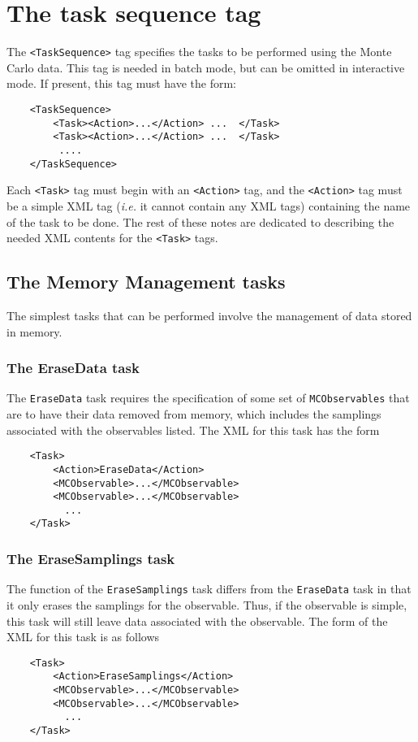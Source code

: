 \documentclass[12pt]{article}
\newcommand{\vb}{\texttt}
\begin{document}
\section{The task sequence tag}

The \vb{<TaskSequence>} tag specifies the tasks to be performed using the 
Monte Carlo data.  This tag is needed in batch mode, but 
can be omitted in interactive mode.  If present, this tag must have the form:
\begin{verbatim}
    <TaskSequence>
        <Task><Action>...</Action> ...  </Task>
        <Task><Action>...</Action> ...  </Task>
         .... 
    </TaskSequence>
\end{verbatim}
Each \vb{<Task>} tag must begin with an \vb{<Action>} tag, and
the \vb{<Action>} tag must be a simple XML tag (\textit{i.e.} it cannot contain
any XML tags) containing the name of the task to be done.
The rest of these notes are dedicated to describing the needed XML contents
for the \vb{<Task>} tags.

\subsection{The Memory Management tasks}

The simplest tasks that can be performed involve the management
of data stored in memory.

\subsubsection{The EraseData task}

The \vb{EraseData} task requires the specification of some set
of \vb{MCObservables} that are to have their data removed
from memory, which includes the samplings associated with
the observables listed. The XML for this task has the form
\begin{verbatim}
    <Task>
        <Action>EraseData</Action>
        <MCObservable>...</MCObservable> 
        <MCObservable>...</MCObservable>
          ...
    </Task>
\end{verbatim}

\subsubsection{The EraseSamplings task}

The function of the \vb{EraseSamplings} task differs from the
\vb{EraseData} task in that it only erases the samplings for
the observable. Thus, if the observable is simple, this task
will still leave data associated with the observable. The form
of the XML for this task is as follows
\begin{verbatim}
    <Task>
        <Action>EraseSamplings</Action>
        <MCObservable>...</MCObservable> 
        <MCObservable>...</MCObservable>
          ...
    </Task>
\end{verbatim}
\end{document}
